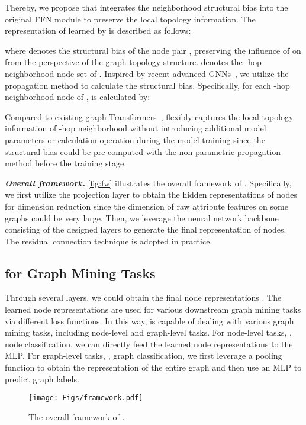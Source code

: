 \documentclass[sigconf, screen]{acmart}
\begin{document}
Thereby, we propose \sffn that integrates the neighborhood structural bias into the original FFN module to preserve the local topology information. 
The representation of  learned by \sffn is described as follows:

where  denotes the structural bias of the node pair , preserving the influence of  on  from the perspective of the graph topology structure.
 denotes the -hop neighborhood node set of . 
Inspired by recent advanced GNNs~\cite{sgc,rlp,gdc}, we utilize the propagation method to calculate the structural bias. 
Specifically, for each -hop neighborhood node  of ,  is calculated by: 


Compared to existing graph Transformers~\cite{nodeformer,gps,transformer}, 
\sffn flexibly captures the local topology information of -hop neighborhood without introducing additional model parameters or calculation operation during the model training since the structural bias  could be pre-computed with the non-parametric propagation method before the training stage.

\textit{\textbf{Overall framework.}}
\autoref{fig:fw} illustrates the overall framework of \name.
Specifically, we first utilize the projection layer to obtain the hidden representations of nodes for dimension reduction since the dimension of raw attribute features on some graphs could be very large.
Then, we leverage the neural network backbone consisting of the designed layers to generate the final representation of nodes.
The residual connection technique is adopted in practice.

\subsection{\name for Graph Mining Tasks}
Through several \name layers, we could obtain the final node representations . 
The learned node representations are used for various downstream graph mining tasks via different loss functions.
In this way, \name is capable of dealing with various graph mining tasks, including node-level and graph-level tasks. 
For node-level tasks, \eg, node classification, we can directly feed the learned node representations to the MLP.
For graph-level tasks, \eg, graph classification, we first leverage a pooling function to obtain the representation of the entire graph and then use an MLP to predict graph labels.


\begin{figure}[t]
\centering
\texttt{[image: Figs/framework.pdf]}
\caption{
The overall framework of \name.
}
\label{fig:fw}
\end{figure}
\end{document}
